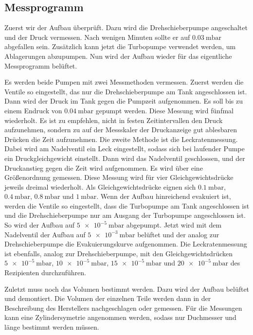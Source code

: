 \subsection{Messprogramm}
Zuerst wir der Aufbau überprüft. Dazu wird die Drehschieberpumpe angeschaltet und der Druck vermessen. Nach wenigen Minuten sollte er auf
$\SI{0.03}{\milli \bar}$ abgefallen sein. Zusätzlich kann jetzt die Turbopumpe verwendet werden, um Ablagerungen abzupumpen. Nun wird der Aufbau wieder für das
eigentliche Messprogramm belüftet.

Es werden beide Pumpen mit zwei Messmethoden vermessen. Zuerst werden die Ventile so eingestellt, das nur die
Drehschieberpumpe am Tank angeschlossen ist. Dann wird der Druck im Tank gegen die Pumpzeit aufgenommen. Es soll bis zu einem Endruck von
$\SI{0.04}{\milli \bar}$ gepumpt werden. Diese Messung wird fünfmal wiederholt. Es ist zu empfehlen, nicht in festen Zeitintervallen den Druck aufzunehmen,
sondern zu auf der Messskaler der Druckanzeige gut ablesbaren Drücken die Zeit aufzunehmen.
Die zweite Methode ist die Leckratenmessung. Dabei wird am Nadelventil ein Leck eingestellt, sodass sich bei laufender Pumpe ein Druckgleichgewicht einstellt.
Dann wird das Nadelventil geschlossen, und der Druckanstieg gegen die Zeit wird aufgenommen. Es wird über eine Größenordnung gemessen. Diese Messung
wird für vier Gleichgewichtsdrücke jeweils dreimal wiederholt. Als Gleichgewichtsdrücke eignen sich $\SI{0.1}{\milli \bar}$,
$\SI{0.4}{\milli \bar}$, $\SI{0.8}{\milli \bar}$ und $\SI{1}{\milli \bar}$. Wenn der Aufbau
hinreichend evakuiert ist, werden die Ventile so eingestellt, dass die Turbopumpe am Tank angeschlossen ist und die Drehschieberpumpe nur am Ausgang der
Turbopumpe angeschlossen ist. So wird der Aufbau auf $\SI{5e-5}{\milli \bar}$ abgepumpt. Jetzt wird mit dem Nadelventil der Aufbau auf $\SI{5e-3}{\milli \bar}$
belüftet und der analog zur Drehschieberpumpe die Evakuierungskurve aufgenommen. Die Leckratenmessung ist ebenfalls, analog zur Drehschieberpumpe, mit den
Gleichgewichtsdrücken $\SI{5e-5}{\milli \bar}$, $\SI{10e-5}{\milli \bar}$, $\SI{15e-5}{\milli \bar}$ und $\SI{20e-5}{\milli \bar}$ des Rezipienten durchzuführen.

Zuletzt muss noch das Volumen bestimmt werden. Dazu wird der Aufbau belüftet und demontiert. Die Volumen der einzelnen Teile werden dann in der Beschreibung
des Herstellers nachgeschlagen oder gemessen. Für die Messungen kann eine Zylindersymetrie angenommen werden, sodass nur Duchmesser und länge bestimmt werden müssen.
